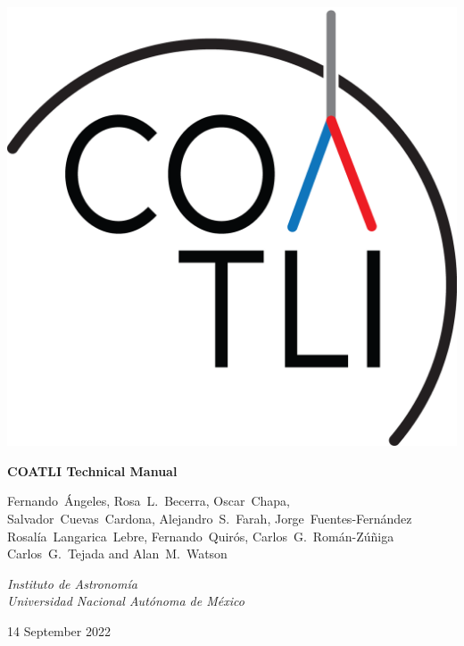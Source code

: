 
\pagestyle{empty}

\begin{centering}

\ifcoatli
\bigskip
\bigskip
\includegraphics[width=\linewidth]{figures/logo-gn.png}
\bigskip
\bigskip
{
 \Large
 \bfseries 
 COATLI Technical Manual
 \par
}
\bigskip
{
\baselineskip=10pt
 \large
 Fernando~Ángeles,
 Rosa~L.~Becerra,
 Oscar~Chapa,\\
 Salvador~Cuevas~Cardona,
 Alejandro~S.~Farah,
 Jorge~Fuentes-Fernández\\
 Rosalía~Langarica~Lebre,
 Fernando~Quirós,
 Carlos~G.~Román-Zúñiga\\
 Carlos~G.~Tejada
 and
 Alan~M.~Watson
 \par
}
\bigskip
{
 \large
 \itshape 
 Instituto de Astronomía\\
 Universidad Nacional Autónoma de México
 \par
}
\bigskip
{
 \large
 14 September 2022
}
\fi

\ifcolibri
\bigskip
\bigskip


\end{centering}
